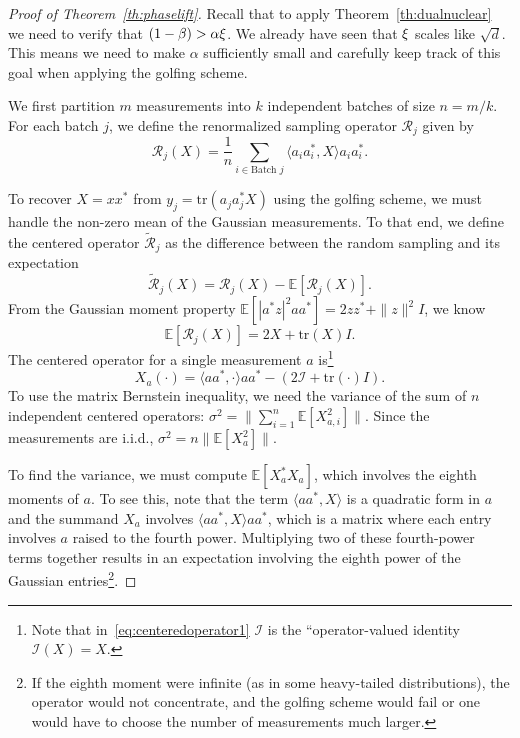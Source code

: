 \begin{proof}[Proof of Theorem~\ref{th:phaselift}]
Recall that to apply Theorem~\ref{th:dualnuclear} we need to verify that $(1-\beta) > \alpha \xi$. We already have seen that $\xi$ scales like $\sqrt{d}$. This means we need to make $\alpha$ sufficiently small and carefully keep track of this goal when applying the golfing scheme.

We first partition $m$ measurements into $k$ independent batches of size $n = m/k$. For each batch $j$, we define the renormalized sampling operator $\mathcal{R}_j$ given by
$$\mathcal{R}_j(X) = \frac{1}{n} \sum_{i \in \text{Batch } j} \langle a_i a_i^*, X \rangle a_i a_i^*.$$

To recover $X = xx^*$ from $y_j = \text{tr}(a_j a_j^* X)$ using the golfing scheme, we must handle the non-zero mean of the Gaussian measurements.
To that end, we define the centered operator $\tilde{\mathcal{R}}_j$ as the difference between the random sampling and its expectation
$$\tilde{\mathcal{R}}_j(X) = \mathcal{R}_j(X) - \mathbb{E}[\mathcal{R}_j(X)].$$
From the Gaussian moment property $\mathbb{E}[|a^* z|^2 aa^*] = 2zz^* + \|z\|^2 I$, we know
$$\mathbb{E}[\mathcal{R}_j(X)] = 2X + \text{tr}(X)I.$$
The centered operator for a single measurement $a$ is\footnote{Note that in~\eqref{eq:centeredoperator1} $\mathcal{I}$ is the ``operator-valued identity $\mathcal{I}(X)=X$.}
\begin{equation}\label{eq:centeredoperator1}
X_a(\cdot) = \langle aa^*, \cdot \rangle aa^* - (2{\mathcal I}  + \text{tr}(\cdot)I).
\end{equation}
To use the matrix Bernstein inequality, we need the variance of the sum of $n$ independent centered operators: $\sigma^2 = \| \sum_{i=1}^n \mathbb{E}[X_{a,i}^2] \|$.
Since the measurements are i.i.d., $\sigma^2 = n  \| \mathbb{E}[X_a^2] \|$.


To find the variance,  we must compute $\mathbb{E}[X_a^* X_a]$,
which involves the eighth moments of $a$. To see this, note that the term $\langle a a^*, X \rangle$ is a quadratic form in $a$  and the summand $X_a$ involves $\langle a a^*, X \rangle a a^*$, which is a matrix where each entry involves $a$ raised to the fourth power.
Multiplying two of these fourth-power terms together results in an expectation involving the eighth power of the Gaussian entries\footnote{If the eighth moment were infinite (as in some heavy-tailed distributions), the operator would not concentrate, and the golfing scheme would fail or one would have to choose the number of measurements much larger.}.




\end{proof}
